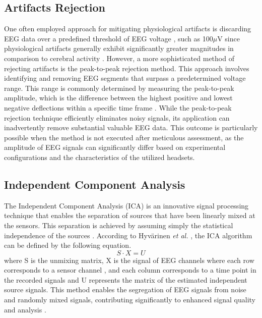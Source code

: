 \subsection{Artifacts Rejection}
One often employed approach for mitigating physiological artifacts is discarding EEG data over a predefined threshold of EEG voltage \cite{jung2000removal}, such as 100$\mu$V since physiological artifacts generally exhibit significantly greater magnitudes in comparison to cerebral activity \cite{survey_brain_biometrics}. However, a more sophisticated method of rejecting artifacts is the peak-to-peak rejection method. This approach involves identifying and removing EEG segments that surpass a predetermined voltage range. This range is commonly determined by measuring the peak-to-peak amplitude, which is the difference between the highest positive and lowest negative deflections within a specific time frame \cite{luck2014introduction}. While the peak-to-peak rejection technique efficiently eliminates noisy signals, its application can inadvertently remove substantial valuable EEG data. This outcome is particularly possible when the method is not executed after meticulous assessment, as the amplitude of EEG signals can significantly differ based on experimental configurations and the characteristics of the utilized headsets.  

\subsection{Independent Component Analysis}
The Independent Component Analysis (ICA) is an innovative signal processing technique that enables the separation of sources that have been linearly mixed at the sensors. This separation is achieved by assuming simply the statistical independence of the sources \cite{vigario2000independent}. According to Hyv\"arinen \textit{et al.} \cite{hyvarinen1999fixed}, the ICA algorithm can be defined by the following equation.
\begin{equation}
S \cdot X=U
\end{equation}
where S is the unmixing matrix, X is the signal of EEG channels where each row corresponds to a sensor channel , and each column corresponds to a time point in the recorded signals and U represents the matrix of the estimated independent source signals. This method enables the segregation of EEG signals from noise and randomly mixed signals, contributing significantly to enhanced signal quality and analysis .  


